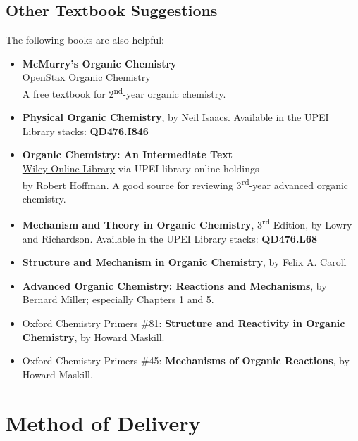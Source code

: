 \subsection{Other Textbook Suggestions}
The following books are also helpful:

\begin{itemize}
\item \textbf{McMurry's Organic Chemistry}\\
\href{https://openstax.org/details/books/organic-chemistry}{OpenStax Organic Chemistry}\\
A free textbook for 2\textsuperscript{nd}-year organic chemistry.

\item \textbf{Physical Organic Chemistry}, by Neil Isaacs. Available in the UPEI Library stacks: \textbf{QD476.I846}

\item \textbf{Organic Chemistry: An Intermediate Text}\\
\href{https://onlinelibrary-wiley-com.proxy.library.upei.ca/doi/book/10.1002/0471648736}{Wiley Online Library} via UPEI library online holdings\\
by Robert Hoffman. A good source for reviewing 3\textsuperscript{rd}-year advanced organic chemistry.

\item \textbf{Mechanism and Theory in Organic Chemistry}, 3\textsuperscript{rd} Edition, by Lowry and Richardson. Available in the UPEI Library stacks: \textbf{QD476.L68}

\item \textbf{Structure and Mechanism in Organic Chemistry}, by Felix A. Caroll

\item \textbf{Advanced Organic Chemistry: Reactions and Mechanisms}, by Bernard Miller; especially Chapters 1 and 5.

\item Oxford Chemistry Primers \#81: \textbf{Structure and Reactivity in Organic Chemistry}, by Howard Maskill.

\item Oxford Chemistry Primers \#45: \textbf{Mechanisms of Organic Reactions}, by Howard Maskill.
\end{itemize}

\section{Method of Delivery}

